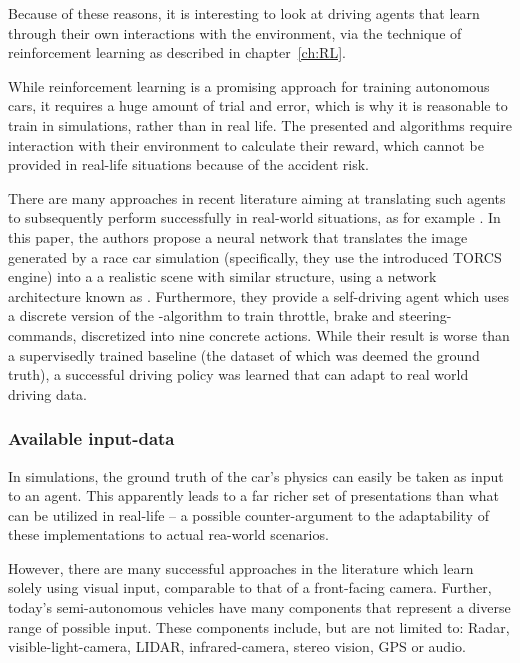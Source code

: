 Because of these reasons, it is interesting to look at driving agents that learn through their own interactions with the environment, via the technique of reinforcement learning as described in chapter~\ref{ch:RL}.

While reinforcement learning is a promising approach for training autonomous cars, it requires a huge amount of trial and error, which is why it is reasonable to train in simulations, rather than in real life. The presented  and  algorithms require interaction with their environment to calculate their reward, which cannot be provided in real-life situations because of the accident risk.

There are many approaches in recent literature aiming at translating such agents to subsequently perform successfully in real-world situations, as for example \cite{you_virtual_2017}. In this paper, the authors propose a neural network that translates the image generated by a race car simulation (specifically, they use the introduced TORCS engine) into a a realistic scene with similar structure, using a network architecture known as \cite{badrinarayanan_segnet:_2015}. 
Furthermore, they provide a self-driving agent which uses a discrete version of the  \cite{mnih_asynchronous_2016}-algorithm to train throttle, brake and steering-commands, discretized into nine concrete actions. While their result is worse than a supervisedly trained baseline (the dataset of which was deemed the ground truth), a successful driving policy was learned that can adapt to real world driving data.

\subsubsection{Available input-data}

In simulations, the ground truth of the car's physics can easily be taken as input to an agent. This apparently leads to a far richer set of presentations than what can be utilized in real-life -- a possible counter-argument to the adaptability of these implementations to actual rea-world scenarios.

However, there are many successful approaches in the literature which learn solely using visual input, comparable to that of a front-facing camera. Further, today's semi-autonomous vehicles have many components that represent a diverse range of possible input. These components include, but are not limited to: Radar, visible-light-camera, LIDAR, infrared-camera, stereo vision, GPS or audio. 

